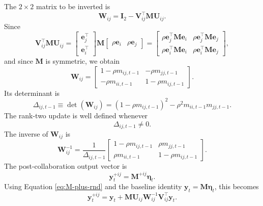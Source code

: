 The $2\times 2$ matrix to be inverted is
\begin{equation}
\mathbf{W}_{ij}
=
\mathbf{I}_2
-
\mathbf{V}_{ij}^{\top}\mathbf{M}\mathbf{U}_{ij}.
\label{eq:W-def-rnd}
\end{equation}
Since
\[
\mathbf{V}_{ij}^{\top}\mathbf{M}\mathbf{U}_{ij}
=
\begin{bmatrix}
\mathbf{e}_j^\top \\
\mathbf{e}_i^\top
\end{bmatrix}
\mathbf{M}
\begin{bmatrix}
\rho\mathbf{e}_i & \rho\mathbf{e}_j
\end{bmatrix}
=
\begin{bmatrix}
\rho\mathbf{e}_j^\top\mathbf{M}\mathbf{e}_i
&
\rho\mathbf{e}_j^\top\mathbf{M}\mathbf{e}_j
\\
\rho\mathbf{e}_i^\top\mathbf{M}\mathbf{e}_i
&
\rho\mathbf{e}_i^\top\mathbf{M}\mathbf{e}_j
\end{bmatrix},
\]
and since $\mathbf{M}$ is symmetric, we obtain
\begin{equation}
\mathbf{W}_{ij}
=
\begin{bmatrix}
1-\rho m_{ij,t-1}
&
-\rho m_{jj,t-1}
\\
-\rho m_{ii,t-1}
&
1-\rho m_{ij,t-1}
\end{bmatrix}.
\label{eq:W-rnd}
\end{equation}
Its determinant is
\begin{equation}
\Delta_{ij,t-1}
\equiv
\det(\mathbf{W}_{ij})
=
(1-\rho m_{ij,t-1})^2
-
\rho^2m_{ii,t-1}m_{jj,t-1}.
\label{eq:Delta-rnd}
\end{equation}
The rank-two update is well defined whenever
\[
\Delta_{ij,t-1}\neq 0.
\]
The inverse of $\mathbf{W}_{ij}$ is
\begin{equation}
\mathbf{W}_{ij}^{-1}
=
\frac{1}{\Delta_{ij,t-1}}
\begin{bmatrix}
1-\rho m_{ij,t-1}
&
\rho m_{jj,t-1}
\\
\rho m_{ii,t-1}
&
1-\rho m_{ij,t-1}
\end{bmatrix}.
\label{eq:W-inverse-rnd}
\end{equation}
The post-collaboration output vector is
\[
\mathbf{y}_t^{+ij}
=
\mathbf{M}^{+ij}\bm{\eta}_t.
\]
Using Equation \eqref{eq:M-plus-rnd} and the baseline identity
$\mathbf{y}_t=\mathbf{M}\bm{\eta}_t$, this becomes
\begin{equation}
\mathbf{y}_t^{+ij}
=
\mathbf{y}_t
+
\mathbf{M}\mathbf{U}_{ij}
\mathbf{W}_{ij}^{-1}
\mathbf{V}_{ij}^{\top}\mathbf{y}_t.
\label{eq:y-plus-rnd}
\end{equation}
